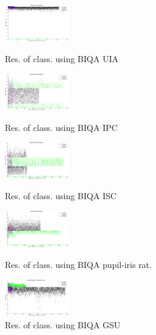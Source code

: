 \begin{figure}[h]
	\hfill
	\begin{minipage}{0.48\linewidth}
		\centering
		\includegraphics[width=0.9\linewidth, height=1.6cm]{pics/iqa_clas_usable_area}
		\caption{Res. of class. using BIQA UIA}
		\label{fig:clas_ua}
	\end{minipage}
	\begin{minipage}{0.48\linewidth}
		\centering
		\includegraphics[width=0.9\linewidth, height=1.6cm]{pics/biqa_clas_ipc}
		\caption{Res. of class. using BIQA IPC}
		\label{fig:clas_ipc}
	\end{minipage}
	\hfill
	\begin{minipage}{0.48\linewidth}
		\centering
		\includegraphics[width=0.9\linewidth, height=1.6cm]{pics/biqa_clas_isc}
		\caption{Res. of class. using BIQA ISC}
		\label{fig:clas_isc}
	\end{minipage}
	\begin{minipage}{0.48\linewidth}
		\centering
		\includegraphics[width=0.9\linewidth, height=1.6cm]{pics/biqa_clas_pir}
		\caption{Res. of class. using BIQA pupil-iris rat.}
		\label{fig:clas_pir}
	\end{minipage}
	\hfill
	\begin{minipage}{0.48\linewidth}
		\centering
		\includegraphics[width=0.9\linewidth, height=1.6cm]{pics/biqa_clas_gsu}
		\caption{Res. of class. using BIQA GSU}
		\label{fig:clas_gsu}
	\end{minipage}
\end{figure}
